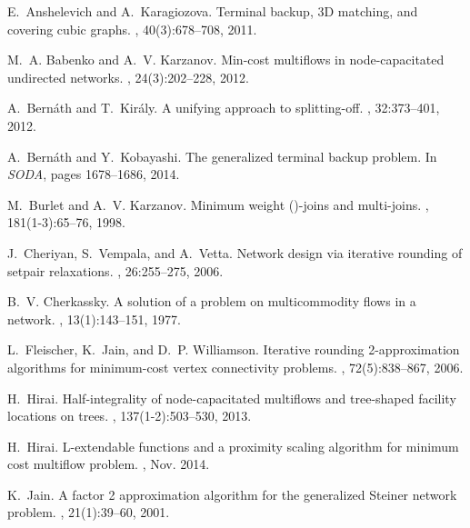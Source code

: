 \documentclass{article}
\begin{document}
\begin{thebibliography}{10}

E.~Anshelevich and A.~Karagiozova.
\newblock Terminal backup, {3D} matching, and covering cubic graphs.
, 40(3):678--708, 2011.

M.~A. Babenko and A.~V. Karzanov.
\newblock Min-cost multiflows in node-capacitated undirected networks.
, 24(3):202--228, 2012.

A.~Bern{\'a}th and T.~Kir{\'a}ly.
\newblock A unifying approach to splitting-off.
, 32:373--401, 2012.

A.~Bern{\'a}th and Y.~Kobayashi.
\newblock The generalized terminal backup problem.
\newblock In {\em {SODA}}, pages 1678--1686, 2014.

M.~Burlet and A.~V. Karzanov.
\newblock Minimum weight {()}-joins and multi-joins.
, 181(1-3):65--76, 1998.

J.~Cheriyan, S.~Vempala, and A.~Vetta.
\newblock Network design via iterative rounding of setpair relaxations.
, 26:255--275, 2006.

B.~V. Cherkassky.
\newblock A solution of a problem on multicommodity flows in a network.
, 13(1):143--151, 1977.

L.~Fleischer, K.~Jain, and D.~P. Williamson.
\newblock Iterative rounding 2-approximation algorithms for minimum-cost vertex
  connectivity problems.
, 72(5):838--867, 2006.

H.~Hirai.
\newblock Half-integrality of node-capacitated multiflows and tree-shaped
  facility locations on trees.
, 137(1-2):503--530, 2013.

H.~Hirai.
\newblock L-extendable functions and a proximity scaling algorithm for minimum
  cost multiflow problem.
, Nov. 2014.

K.~Jain.
\newblock A factor 2 approximation algorithm for the generalized {S}teiner
  network problem.
, 21(1):39--60, 2001.


\end{thebibliography}
\end{document}
